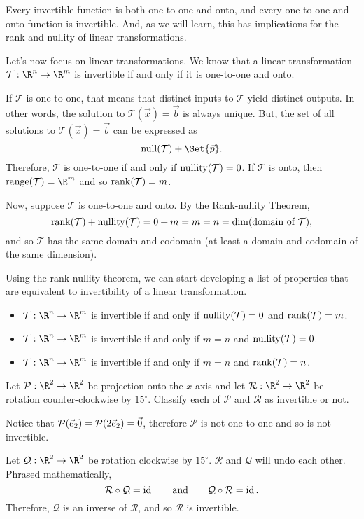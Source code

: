 
Every invertible function is both one-to-one and onto, and every one-to-one and onto function
is invertible. And, as we will learn, this has implications for the rank and nullity of linear transformations.


Let's now focus on linear transformations. We know that a linear transformation $\mathcal T:\R^n\to\R^m$ is
invertible if and only if it is one-to-one and onto. 

If $\mathcal T$ is one-to-one, that means that distinct inputs to $\mathcal T$ yield distinct outputs. In other words,
the solution to $\mathcal T(\vec x)=\vec b$ is always unique. But, the set of all solutions to $\mathcal T(\vec x)=\vec b$
can be expressed as
\[
	\Null(\mathcal T)+\Set{\vec p}.
\]
Therefore, $\mathcal T$ is one-to-one if and only if $\operatorname{nullity}(\mathcal T)=0$.
If $\mathcal T$ is onto, then $\Range(\mathcal T)=\R^m$ and so $\operatorname{rank}(\mathcal T)=m$. 

Now, suppose $\mathcal T$ is one-to-one and onto. By the Rank-nullity Theorem,
\[
	\operatorname{rank}(\mathcal T)+\operatorname{nullity}(\mathcal T) = 0+m=m=n=\operatorname{dim}(\text{domain of $\mathcal T$}),
\]
and so $\mathcal T$ has the same domain and codomain (at least a domain and codomain of the same dimension).

Using the rank-nullity theorem, we can start developing a list of properties that are equivalent to invertibility of a
linear transformation.
\begin{itemize}
	\item $\mathcal T:\R^n\to\R^m$ is invertible if and only if $\operatorname{nullity}(\mathcal T)=0$ and $\operatorname{rank}(\mathcal T)=m$.
	\item $\mathcal T:\R^n\to\R^m$ is invertible if and only if $m=n$ and $\operatorname{nullity}(\mathcal T)=0$.
	\item $\mathcal T:\R^n\to\R^m$ is invertible if and only if $m=n$ and $\operatorname{rank}(\mathcal T)=n$.
\end{itemize}

\begin{example}
	Let $\mathcal P:\R^2\to\R^2$ be projection onto the $x$-axis and let $\mathcal R:\R^2\to\R^2$ be rotation counter-clockwise
	by $15^\circ$. Classify each of $\mathcal P$ and $\mathcal R$ as invertible or not.
	
	\medskip
	Notice that $\mathcal P({\vec e_2})=\mathcal P(2{\vec e_2})=\vec 0$, therefore $\mathcal P$ is not one-to-one and so is not invertible.
	
	\medskip
	Let $\mathcal Q: \R^2\to\R^2$ be rotation clockwise by $15^\circ$. $\mathcal R$ and $\mathcal Q$ will undo each other. Phrased mathematically,
	\[
	    \mathcal R\circ \mathcal Q=\operatorname{\operatorname{id}}\qquad\text{and}\qquad \mathcal Q\circ \mathcal R=\operatorname{\operatorname{id}}.
	\]
	Therefore, $\mathcal Q$ is an inverse of $\mathcal R$, and so $\mathcal R$ is invertible. 
\end{example}

